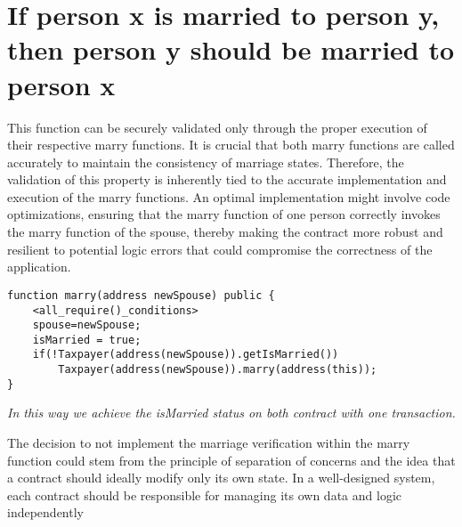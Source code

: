 \documentclass{article}
\begin{document}
\section{If person x is married to person y, then person y should be married to person x}
This function can be securely validated only through the proper execution of their respective marry functions. It is crucial that both marry functions are called accurately to maintain the consistency of marriage states. Therefore, the validation of this property is inherently tied to the accurate implementation and execution of the marry functions. An optimal implementation might involve code optimizations, ensuring that the marry function of one person correctly invokes the marry function of the spouse, thereby making the contract more robust and resilient to potential logic errors that could compromise the correctness of the application. 
\begin{verbatim}
function marry(address newSpouse) public {
    <all_require()_conditions>
    spouse=newSpouse;
    isMarried = true;
    if(!Taxpayer(address(newSpouse)).getIsMarried())
        Taxpayer(address(newSpouse)).marry(address(this));
}
\end{verbatim}

\textit{In this way we achieve the isMarried status on both contract with one transaction.}

The decision to not implement the marriage verification within the marry function could stem from the principle of separation of concerns and the idea that a contract should ideally modify only its own state. In a well-designed system, each contract should be responsible for managing its own data and logic independently
\end{document}
